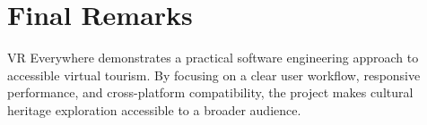 \documentclass{tietreport}
\begin{document}
\section{Final Remarks}

VR Everywhere demonstrates a practical software engineering approach to accessible virtual tourism. By focusing on a clear user workflow, responsive performance, and cross-platform compatibility, the project makes cultural heritage exploration accessible to a broader audience.


\printbibliography[heading=bibintoc]
\end{document}
